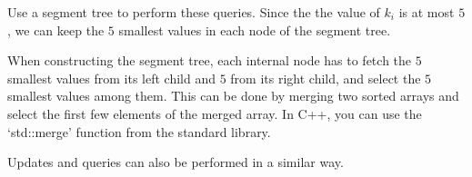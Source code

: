 Use a segment tree to perform these queries. 
Since the the value of $k_i$ is at most $5$, we can keep the $5$ smallest values in each node of the segment tree.

When constructing the segment tree,
each internal node has to fetch the $5$ smallest values from its left child and $5$ from its right child,
and select the $5$ smallest values among them. This can be done by merging two sorted arrays and select the first few elements of the merged array.
In C++, you can use the `std::merge' function from the standard library.

Updates and queries can also be performed in a similar way.